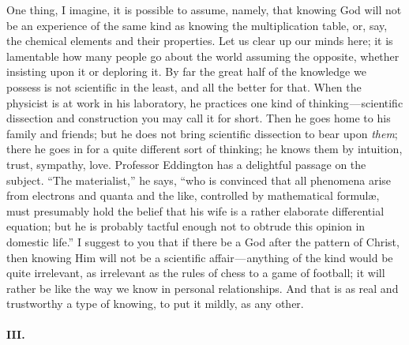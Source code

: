 \documentclass[12pt]{article}
\begin{document}
One thing, I imagine, it is possible to assume, namely, that knowing God
will not be an experience of the same kind as knowing the multiplication
table, or, say, the chemical elements and their properties. Let us clear
up our minds here; it is lamentable how many people go about the world
assuming the opposite, whether insisting upon it or deploring it. By far
the great half of the knowledge we possess is not scientific in the
least, and all the better for that. When the physicist is at work in his
laboratory, he practices one kind of thinking --- scientific dissection
and construction you may call it for short. Then he goes home to his
family and friends; but he does not bring scientific dissection to bear
upon \emph{them}; there he goes in for a quite different sort of
thinking; he knows them by intuition, trust, sympathy, love. Professor
Eddington has a delightful passage on the subject. ``The materialist,''
he says, ``who is convinced that all phenomena arise from electrons and
quanta and the like, controlled by mathematical formulæ, must presumably
hold the belief that his wife is a rather elaborate differential
equation; but he is probably tactful enough not to obtrude this opinion
in domestic life.'' I suggest to you that if there be a God after the
pattern of Christ, then knowing Him will not be a scientific
affair --- anything of the kind would be quite irrelevant, as irrelevant
as the rules of chess to a game of football; it will rather be like the
way we know in personal relationships. And that is as real and
trustworthy a type of knowing, to put it mildly, as any other.

\paragraph{III.}\label{28ff}
\end{document}
